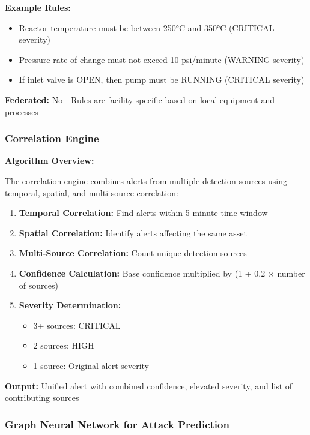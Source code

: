 \documentclass[12pt,a4paper]{article}
\begin{document}
\textbf{Example Rules:}
\begin{itemize}[leftmargin=1cm,itemsep=0pt]
    \item Reactor temperature must be between 250°C and 350°C (CRITICAL severity)
    \item Pressure rate of change must not exceed 10 psi/minute (WARNING severity)
    \item If inlet valve is OPEN, then pump must be RUNNING (CRITICAL severity)
\end{itemize}

\textbf{Federated:} No - Rules are facility-specific based on local equipment and processes

\subsubsection{Correlation Engine}

\textbf{Algorithm Overview:}

The correlation engine combines alerts from multiple detection sources using temporal, spatial, and multi-source correlation:

\begin{enumerate}[leftmargin=1cm,itemsep=0pt]
    \item \textbf{Temporal Correlation:} Find alerts within 5-minute time window
    \item \textbf{Spatial Correlation:} Identify alerts affecting the same asset
    \item \textbf{Multi-Source Correlation:} Count unique detection sources
    \item \textbf{Confidence Calculation:} Base confidence multiplied by (1 + 0.2 × number of sources)
    \item \textbf{Severity Determination:}
    \begin{itemize}
        \item 3+ sources: CRITICAL
        \item 2 sources: HIGH
        \item 1 source: Original alert severity
    \end{itemize}
\end{enumerate}

\textbf{Output:} Unified alert with combined confidence, elevated severity, and list of contributing sources

\subsubsection{Graph Neural Network for Attack Prediction}
\end{document}
